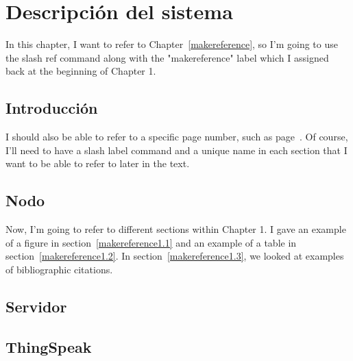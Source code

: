 \cleardoublepage

\chapter{Descripción del sistema}
\label{makereference2}

In this chapter, I want to refer to Chapter~\ref{makereference},
so I'm going to use the slash ref command along with the
"makereference" label which I assigned back at the beginning of
Chapter 1.

\section{Introducción}
\label{makereference2.1} I should also be able to refer to a
specific page number, such as page~\pageref{makereference}.  Of
course, I'll need to have a slash label command and a unique name
in each section that I want to be able to refer to later in the
text.

\section{Nodo}
\label{makereference2.2} Now, I'm going to refer to different
sections within Chapter 1. I gave an example of a figure in
section~\ref{makereference1.1} and an example of a table in
section~\ref{makereference1.2}.  In
section~\ref{makereference1.3}, we looked at examples of
bibliographic citations.

\section{Servidor}
\label{makereference2.3}

\section{ThingSpeak}
\label{makereference2.4}